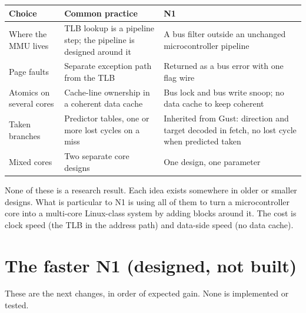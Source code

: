 \documentclass[10pt,a4paper]{article}
\begin{document}
\begin{center}\small
\begin{tabularx}{\linewidth}{@{}lXX@{}}
\toprule
Choice & Common practice & N1\\
\midrule
Where the MMU lives & TLB lookup is a pipeline step; the pipeline is designed around it & A bus filter outside an unchanged microcontroller pipeline\\
Page faults & Separate exception path from the TLB & Returned as a bus error with one flag wire\\
Atomics on several cores & Cache-line ownership in a coherent data cache & Bus lock and bus write snoop; no data cache to keep coherent\\
Taken branches & Predictor tables, one or more lost cycles on a miss & Inherited from Gust: direction and target decoded in fetch, no lost cycle when predicted taken\\
Mixed cores & Two separate core designs & One design, one parameter\\
\bottomrule
\end{tabularx}
\end{center}
None of these is a research result. Each idea exists somewhere in older or smaller designs. What is
particular to N1 is using all of them to turn a microcontroller core into a multi-core Linux-class system
by adding blocks around it. The cost is clock speed (the TLB in the address path) and data-side speed
(no data cache).

\section{The faster N1 (designed, not built)}\label{sec:faster}
These are the next changes, in order of expected gain. None is implemented or tested.
\end{document}

